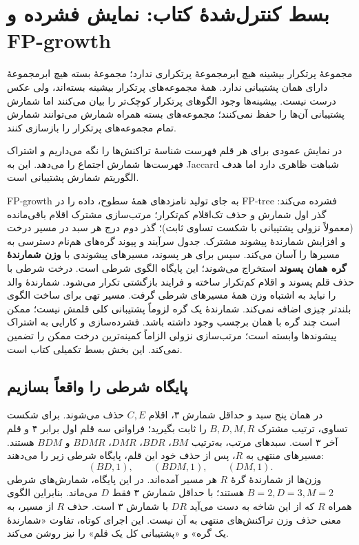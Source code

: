 \documentclass[12pt,a4paper,oneside]{report}
\newcounter{ex}[chapter]
\begin{document}
\section{بسط کنترل‌شدهٔ کتاب: نمایش فشرده و FP-growth}

مجموعهٔ پرتکرار بیشینه هیچ ابرمجموعهٔ پرتکراری ندارد؛ مجموعهٔ بسته هیچ ابرمجموعهٔ دارای همان پشتیبانی ندارد. همهٔ مجموعه‌های پرتکرار بیشینه بسته‌اند، ولی عکس درست نیست. بیشینه‌ها وجود الگوهای پرتکرار کوچک‌تر را بیان می‌کنند اما شمارش پشتیبانی آن‌ها را حفظ نمی‌کنند؛ مجموعه‌های بسته همراه شمارش می‌توانند شمارش تمام مجموعه‌های پرتکرار را بازسازی کنند.

در نمایش عمودی برای هر قلم فهرست شناسهٔ تراکنش‌ها را نگه می‌داریم و اشتراک فهرست‌ها شمارش اجتماع را می‌دهد. این به Jaccard شباهت ظاهری دارد اما هدف الگوریتم شمارش پشتیبانی است.

FP-growth به جای تولید نامزدهای همهٔ سطوح، داده را در FP-tree فشرده می‌کند: گذر اول شمارش و حذف تک‌اقلام کم‌تکرار؛ مرتب‌سازی مشترک اقلام باقی‌مانده (معمولاً نزولی پشتیبانی با شکست تساوی ثابت)؛ گذر دوم درج هر سبد در مسیر درخت و افزایش شمارندهٔ پیشوند مشترک. جدول سرآیند و پیوند گره‌های هم‌نام دسترسی به مسیرها را آسان می‌کند. سپس برای هر پسوند، مسیرهای پیشوندی با \textbf{وزن شمارندهٔ گره همان پسوند} استخراج می‌شوند؛ این پایگاه الگوی شرطی است. درخت شرطی با حذف قلم پسوند و اقلام کم‌تکرار ساخته و فرایند بازگشتی تکرار می‌شود. شمارندهٔ والد را نباید به اشتباه وزن همهٔ مسیرهای شرطی گرفت. مسیر تهی برای ساخت الگوی بلندتر چیزی اضافه نمی‌کند. شمارندهٔ یک گره لزوماً پشتیبانی کلی قلمش نیست؛ ممکن است چند گره با همان برچسب وجود داشته باشد. فشرده‌سازی و کارایی به اشتراک پیشوندها وابسته است؛ مرتب‌سازی نزولی الزاماً کمینه‌ترین درخت ممکن را تضمین نمی‌کند. این بخش بسط تکمیلی کتاب است.


\subsection*{پایگاه شرطی را واقعاً بسازیم}
در همان پنج سبد و حداقل شمارش ۳، اقلام $C,E$ حذف می‌شوند. برای شکست تساوی، ترتیب مشترک $B,D,M,R$ را ثابت بگیرید؛ فراوانی سه قلم اول برابر ۴ و قلم آخر ۳ است. سبدهای مرتب، به‌ترتیب $BM$، $BDR$، $DMR$، $BDMR$ و $BDM$ هستند. مسیرهای منتهی به $R$، پس از حذف خود این قلم، پایگاه شرطی زیر را می‌دهند:
\[ (BD,1),\qquad(BDM,1),\qquad(DM,1).\]
وزن‌ها از شمارندهٔ گرهٔ $R$ هر مسیر آمده‌اند. در این پایگاه، شمارش‌های شرطی $B=2,D=3,M=2$ هستند؛ با حداقل شمارش ۳ فقط $D$ می‌ماند. بنابراین الگوی همراه $R$ که از این شاخه به دست می‌آید $DR$ با شمارش ۳ است. حذف $R$ از مسیر، به معنی حذف وزن تراکنش‌های منتهی به آن نیست. این اجرای کوتاه، تفاوت «شمارندهٔ یک گره» و «پشتیبانی کل یک قلم» را نیز روشن می‌کند.
\end{document}
